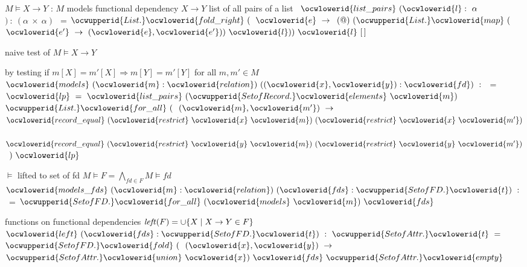 \documentclass[12pt]{article}
\begin{document}
\ocwendcode{}\ocwindent{0.00em}
$M \models X \to Y$ : $M$ models functional dependency $X \to Y$ 
\ocweol
\ocwindent{0.00em}
list of all pairs of a list 
\ocweol
\label{rellens.ml:7050}%
\medskip
\ocwbegincode{}\ocwindent{0.00em}
~$\ocwlowerid{list\_pairs}~(\ocwlowerid{l}:~\alpha{}~$$)~:~(\alpha{}~\times{}~\alpha{})~$~=\ocweol
\ocwindent{1.50em}
$\ocwupperid{List.}\ocwlowerid{fold\_right}~($~$\ocwlowerid{e}~\rightarrow{}$\ocweol
\ocwindent{2.00em}
$(@)~(\ocwupperid{List.}\ocwlowerid{map}~($~$\ocwlowerid{e'}~\rightarrow{}~(\ocwlowerid{e},\ocwlowerid{e'}))~\ocwlowerid{l}))~\ocwlowerid{l}~[\,]$\medskip

\ocwendcode{}\ocwindent{0.00em}
naive test of $M \models X \to Y$

  by testing if $m[X]=m'[X] \Rightarrow m[Y]=m'[Y]$ for all $m,m' \in M$ 
\ocweol
\label{rellens.ml:7289}%
\medskip
\ocwbegincode{}\ocwindent{0.00em}
~$\ocwlowerid{models}~(\ocwlowerid{m}:\ocwlowerid{relation})~((\ocwlowerid{x},\ocwlowerid{y}):\ocwlowerid{fd})~:~$~=\ocweol
\ocwindent{1.00em}
~$\ocwlowerid{lp}~=~\ocwlowerid{list\_pairs}~(\ocwupperid{SetofRecord.}\ocwlowerid{elements}~\ocwlowerid{m})~$\ocweol
\ocwindent{1.00em}
$\ocwupperid{List.}\ocwlowerid{for\_all}~($~$(\ocwlowerid{m},\ocwlowerid{m'})~\rightarrow{}$\ocweol
\ocwindent{2.00em}
~$\ocwlowerid{record\_equal}~(\ocwlowerid{restrict}~\ocwlowerid{x}~\ocwlowerid{m})~(\ocwlowerid{restrict}~\ocwlowerid{x}~\ocwlowerid{m'})$\ocweol
\ocwindent{2.00em}
~$\ocwlowerid{record\_equal}~(\ocwlowerid{restrict}~\ocwlowerid{y}~\ocwlowerid{m})~(\ocwlowerid{restrict}~\ocwlowerid{y}~\ocwlowerid{m'})$\ocweol
\ocwindent{2.00em}
~$)~\ocwlowerid{lp}$\medskip

\ocwendcode{}\ocwindent{0.00em}
$\models$ lifted to set of fd 
\ocweol
\ocwindent{0.00em}
$M \models F = \bigwedge_{\mathit{fd}\in F} M \models \mathit{fd}$ 
\ocweol
\label{rellens.ml:7651}%
\medskip
\ocwbegincode{}\ocwindent{0.00em}
~$\ocwlowerid{models\_fds}~(\ocwlowerid{m}:\ocwlowerid{relation})~(\ocwlowerid{fds}:\ocwupperid{SetofFD.}\ocwlowerid{t})~:~$~=\ocweol
\ocwindent{1.00em}
$\ocwupperid{SetofFD.}\ocwlowerid{for\_all}~(\ocwlowerid{models}~\ocwlowerid{m})~\ocwlowerid{fds}$\medskip

\ocwendcode{}\ocwindent{0.00em}
functions on functional dependencies 
\ocweol
\ocwindent{0.00em}
$\mathit{left}(F) = \cup\{ X \mid  X \to Y \in F\}$ 
\ocweol
\label{rellens.ml:7836}%
\medskip
\ocwbegincode{}\ocwindent{0.00em}
~$\ocwlowerid{left}~(\ocwlowerid{fds}:\ocwupperid{SetofFD.}\ocwlowerid{t})~:~\ocwupperid{SetofAttr.}\ocwlowerid{t}~=~$\ocweol
\ocwindent{2.00em}
$\ocwupperid{SetofFD.}\ocwlowerid{fold}~($~$(\ocwlowerid{x},\ocwlowerid{y})~\rightarrow{}$\ocweol
\ocwindent{3.00em}
$\ocwupperid{SetofAttr.}\ocwlowerid{union}~\ocwlowerid{x})~\ocwlowerid{fds}~\ocwupperid{SetofAttr.}\ocwlowerid{empty}$\medskip
\end{document}
